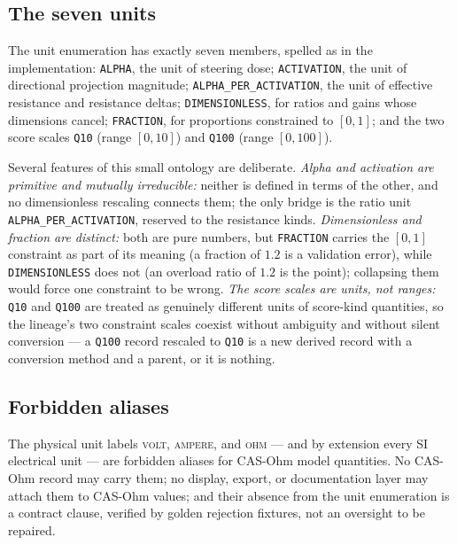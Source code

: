 \subsection{The seven units}\label{ch03:units:seven}

The unit enumeration has exactly seven members, spelled as in the implementation: \texttt{ALPHA}, the unit of steering dose; \texttt{ACTIVATION}, the unit of directional projection magnitude; \texttt{ALPHA\_PER\_ACTIVATION}, the unit of effective resistance and resistance deltas; \texttt{DIMENSIONLESS}, for ratios and gains whose dimensions cancel; \texttt{FRACTION}, for proportions constrained to $[0,1]$; and the two score scales \texttt{Q10} (range $[0,10]$) and \texttt{Q100} (range $[0,100]$).

Several features of this small ontology are deliberate. \emph{Alpha and activation are primitive and mutually irreducible:} neither is defined in terms of the other, and no dimensionless rescaling connects them; the only bridge is the ratio unit \texttt{ALPHA\_PER\_ACTIVATION}, reserved to the resistance kinds. \emph{Dimensionless and fraction are distinct:} both are pure numbers, but \texttt{FRACTION} carries the $[0,1]$ constraint as part of its meaning (a fraction of $1.2$ is a validation error), while \texttt{DIMENSIONLESS} does not (an overload ratio of $1.2$ is the point); collapsing them would force one constraint to be wrong. \emph{The score scales are units, not ranges:} \texttt{Q10} and \texttt{Q100} are treated as genuinely different units of score-kind quantities, so the lineage's two constraint scales coexist without ambiguity and without silent conversion --- a \texttt{Q100} record rescaled to \texttt{Q10} is a new derived record with a conversion method and a parent, or it is nothing.

\subsection{Forbidden aliases}\label{ch03:units:forbidden}

\begin{ruleenv}\label{ch03:rule:forbidden}
The physical unit labels \textsc{volt}, \textsc{ampere}, and \textsc{ohm} --- and by extension every SI electrical unit --- are forbidden aliases for CAS-Ohm model quantities. No CAS-Ohm record may carry them; no display, export, or documentation layer may attach them to CAS-Ohm values; and their absence from the unit enumeration is a contract clause, verified by golden rejection fixtures, not an oversight to be repaired.
\end{ruleenv}

